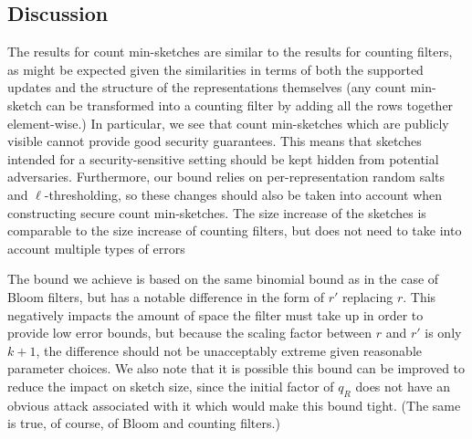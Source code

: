 \subsection{Discussion}
The results for count min-sketches are similar to the results for counting
filters, as might be expected given the similarities in terms of both the
supported updates and the structure of the representations themselves (any
count min-sketch can be transformed into a counting filter by adding all the
rows together element-wise.) In particular, we see that count min-sketches
which are publicly visible cannot provide good security guarantees. This means
that sketches intended for a security-sensitive setting should be kept
hidden from potential adversaries. Furthermore, our bound relies on
per-representation random salts and $\ell$-thresholding, so these changes should
also be taken into account when constructing secure count min-sketches. The size
increase of the sketches is comparable to the size increase of counting filters,
but does not need to take into account multiple types of errors

The bound we achieve is based on the same binomial bound as in the case of Bloom
filters, but has a notable difference in the form of $r'$ replacing $r$. This
negatively impacts the amount of space the filter must take up in order to
provide low error bounds, but because the scaling factor between $r$ and $r'$ is
only $k+1$, the difference should not be unacceptably extreme given reasonable
parameter choices. We also note that it is possible this bound can be improved
to reduce the impact on sketch size, since the initial factor of $q_R$ does not
have an obvious attack associated with it which would make this bound tight.
%
(The same is true, of course, of Bloom and counting filters.)
